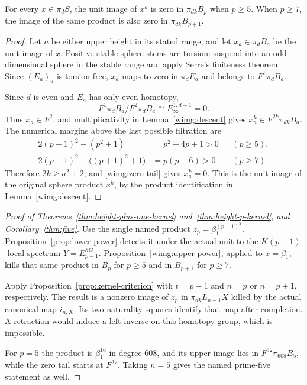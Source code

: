 \begin{proposition}
\label{wimg:upper-power}
For every $x\in\pi_dS$, the unit image of $x^k$ is zero in
$\pi_{dk}B_p$ when $p\geq5$. When $p\geq7$, the image of the
same product is also zero in $\pi_{dk}B_{p+1}$.
\end{proposition}
\begin{proof}
Let $a$ be either upper height in its stated range, and let
$x_a\in\pi_dB_a$ be the unit image of $x$. Positive stable sphere
stems are torsion: suspend into an odd-dimensional sphere in the stable
range and apply Serre's finiteness theorem
\cite[Chapter~V, Section~3, Proposition~3]{serre1951}.
Since $(E_a)_d$ is torsion-free, $x_a$ maps to zero in
$\pi_dE_a$ and belongs to $F^1\pi_dB_a$.

Since $d$ is even and $E_a$ has only even homotopy,
\[
 F^1\pi_dB_a/F^2\pi_dB_a
     \cong E_\infty^{1,d+1}=0.
\]
Thus $x_a\in F^2$, and multiplicativity in
Lemma~\ref{wimg:descent} gives $x_a^k\in F^{2k}\pi_{dk}B_a$.
The numerical margins above the last possible filtration are
\[
\begin{aligned}
 2(p-1)^2-(p^2+1)&=p^2-4p+1>0 &&(p\geq5),\\
 2(p-1)^2-\bigl((p+1)^2+1\bigr)&=p(p-6)>0 &&(p\geq7).
\end{aligned}
\]
Therefore $2k\geq a^2+2$, and \eqref{wimg:zero-tail} gives
$x_a^k=0$. This is the unit image of the original sphere product
$x^k$, by the product identification in Lemma~\ref{wimg:descent}.
\end{proof}

\begin{proof}[Proof of Theorems~\ref{thm:height-plus-one-kernel}
and~\ref{thm:height-p-kernel}, and Corollary~\ref{thm:five}]
Use the single named product $z_p=\beta_1^{(p-1)^2}$.
Proposition~\ref{prop:lower-power} detects it under the actual unit
to the $K(p-1)$-local spectrum $Y=E_{p-1}^{hG}$.
Proposition~\ref{wimg:upper-power}, applied to $x=\beta_1$, kills
that same product in $B_p$ for $p\geq5$ and in $B_{p+1}$ for
$p\geq7$.

Apply Proposition~\ref{prop:kernel-criterion} with $t=p-1$ and
$n=p$ or $n=p+1$, respectively. The result is a nonzero image of
$z_p$ in $\pi_{dk}L_{n-1}X$ killed by the actual canonical map
$i_{n,X}$. Its two naturality squares identify that map after
completion. A retraction would induce a left inverse on this
homotopy group, which is impossible.

For $p=5$ the product is $\beta_1^{16}$ in degree $608$, and its
upper image lies in $F^{32}\pi_{608}B_5$, while the zero tail
starts at $F^{27}$. Taking $n=5$ gives the named prime-five
statement as well.
\end{proof}

